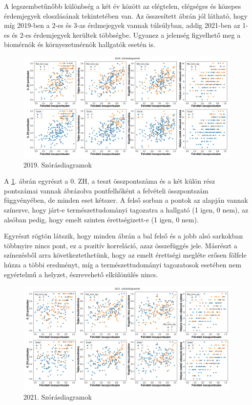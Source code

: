 \documentclass[12pt]{article}
\begin{document}
\noindent A legszembetűnőbb különbség a két év között az elégtelen, elégséges és közepes érdemjegyek eloszlásának tekintetében van. Az összesített ábrán jól látható, hogy míg 2019-ben a 2-es és 3-as érdmejegyek vannak túlsúlyban, addig 2021-ben az 1-es és 2-es érdemjegyek kerültek többségbe. Ugyanez a jelenség figyelhető meg a biomérnök és környezetmérnök hallgatók esetén is.


\begin{figure}[H]
\centering
\includegraphics[width=\textwidth]{kepek/2019scatter.png}
\caption{2019. Szórásdiagramok}
\label{fig:2019scatter}
\end{figure}

A \ref{fig:2019scatter}. ábrán egyrészt a 0. ZH, a teszt összpontszáma és a két külön rész pontszámai vannak ábrázolva pontfelhőként a felvételi összpontszám függvényében, de minden eset kétszer. A felső sorban a pontok az alapján vannak színezve, hogy járt-e természettudományi tagozatra a hallgató (1 igen, 0 nem), az alsóban pedig, hogy emelt szinten érettségizett-e (1 igen, 0 nem).

Egyrészt rögtön látszik, hogy minden ábrán a bal felső és a jobb alsó sarkokban többnyire nincs pont, ez a pozitív korreláció, azaz összefüggés jele. Másrészt a színezésből arra következtethetünk, hogy az emelt érettségi megléte erősen fölfele húzza a többi eredményt, míg a természettudományi tagozatosok esetében nem egyértelmű a helyzet, észrevehető elkülönülés nincs.

\begin{figure}[H]
\centering
\includegraphics[width=\textwidth]{kepek/2021scatter.png}
\caption{2021. Szórásdiagramok}
\label{fig:2021scatter}
\end{figure}
\end{document}
